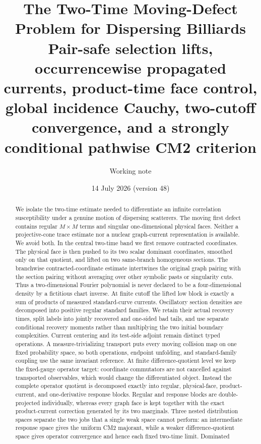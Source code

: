 \documentclass[11pt]{article}
\title{The Two-Time Moving-Defect Problem for Dispersing Billiards\\
\large Pair-safe selection lifts, occurrencewise propagated currents,
product-time face control,
global incidence Cauchy,
two-cutoff convergence, and a strongly conditional
pathwise CM2 criterion}
\author{Working note}
\date{14 July 2026 (version 48)}
\begin{document}
\maketitle

\begin{abstract}\sloppy
We isolate the two-time estimate needed to differentiate an infinite
correlation susceptibility under a genuine motion of dispersing scatterers.
The moving first defect contains regular $M\times M$ terms and singular
one-dimensional physical faces.  Neither a projective-cone trace estimate nor
a nuclear graph-current representation is available.  We avoid both.  In the
central two-time band we first remove contracted coordinates.  The physical
face is then pushed to its two scalar dominant coordinates, smoothed only on
that quotient, and lifted on two same-branch homogeneous sections.  The
branchwise contracted-coordinate estimate intertwines the original graph
pairing with the section pairing without averaging over other symbolic pasts
or singularity cuts.  Thus a two-dimensional Fourier polynomial is never
declared to be a four-dimensional density by a fictitious chart inverse.  At
finite cutoff the lifted low block is exactly a sum of products of measured
standard-curve currents.  Oscillatory section densities are decomposed into
positive regular standard families.  We retain their actual recovery times,
split labels into jointly recovered and one-sided bad tails, and use separate
conditional recovery moments rather than multiplying the two initial boundary
complexities.  Current centering and its test-side adjoint remain
distinct typed operations.  A measure-trivializing transport puts every
moving collision map on one fixed probability space, so both operations,
endpoint unfolding, and standard-family coupling use the same invariant
reference.  At finite difference-quotient level we keep the fixed-gauge
operator target: coordinate commutators are not cancelled against transported
observables, which would change the differentiated object.  Instead the
complete operator quotient is decomposed exactly into regular, physical-face,
product-current, and one-derivative response blocks.  Regular and response
blocks are double-projected individually, whereas every graph face is kept
together with the exact product-current correction generated by its two
marginals.  Three nested distribution spaces separate the two
jobs that a single weak space cannot perform: an intermediate response space
gives the uniform CM2 majorant, while a weaker difference-quotient space gives
operator convergence and hence each fixed two-time limit.  Dominated

\end{abstract}
\end{document}
